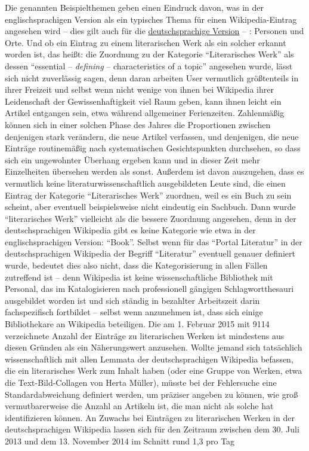 \documentclass[fontsize=12pt]{scrartcl}
\begin{document}
Die genannten Beispielthemen geben einen Eindruck davon, was in der eng\-lischspra\-chi\-gen Version als ein ty\-pisches Thema f\"ur einen Wi\-ki\-pe\-dia-Eintrag angesehen wird -- dies gilt auch f\"ur die \href{https://de.wikipedia.org/wiki/Wikipedia:Kategorien}{deutschspra\-chi\-ge Version} -- : Per\-so\-nen und Orte. Und ob ein Eintrag zu einem li\-te\-ra\-rischen Werk als ein solcher erkannt worden ist, das hei{\ss}t: die Zuordnung zu der Kategorie "`Li\-te\-ra\-risches Werk"' als dessen "`essential -- \textit{defining} -- characteristics of a topic"' angesehen wurde, l\"asst sich nicht zuverl\"assig sagen, denn daran arbei\-ten \mbox{User} vermutlich gr\"o{\ss}tenteils in ihrer Freizeit und \mbox{selbst} wenn nicht wenige von ihnen bei Wi\-ki\-pe\-dia ihrer Leidenschaft der Gewissenhaftigkeit viel Raum geben, kann ihnen leicht ein Artikel entgangen sein, etwa w\"ahrend allgemeiner Ferienzei\-ten. Zahlenm\"a{\ss}ig k\"onnen sich in einer solchen Phase des Jahres die Proportionen zwischen denjenigen stark ver\"andern, die neue Artikel verfassen, und denjenigen, die neue Eintr\"age routinem\"a{\ss}ig nach systematischen Gesichtspunkten durchsehen, so dass sich ein ungewohnter \"Uberhang ergeben kann und in dieser Zeit mehr Einzelhei\-ten \"ubersehen werden als sonst. Au{\ss}erdem ist davon auszugehen, dass es vermutlich keine li\-te\-ra\-tur\-wissenschaftlich ausgebildeten Leute sind, die einen Eintrag der Kategorie "`Li\-te\-ra\-risches Werk"' zuordnen, weil es ein Buch zu sein scheint, aber eventuell beispielsweise nicht eindeutig ein Sachbuch. Dann wurde "`li\-te\-ra\-risches Werk"' viel\-leicht als die bessere Zuordnung angesehen, denn in der deutschspra\-chi\-gen Wi\-ki\-pe\-dia gibt es keine Kategorie wie etwa in der eng\-lischspra\-chi\-gen Version: "`Book"'. \mbox{Selbst} wenn f\"ur das "`Portal Li\-te\-ra\-tur"' in der deutschspra\-chi\-gen Wi\-ki\-pe\-dia der Begriff "`Li\-te\-ra\-tur"' eventuell genauer definiert wurde, bedeutet dies also nicht, dass die Kategorisierung in allen F\"allen zutreffend ist -- denn Wi\-ki\-pe\-dia ist keine wissenschaftliche Bibliothek mit Personal, das im Katalogisieren nach professionell g\"angigen Schlagwortthesauri ausgebildet worden ist und sich st\"andig in bezahlter Arbeitszeit darin fachspezifisch fortbildet -- \mbox{selbst} wenn anzunehmen ist, dass sich einige Bibliothekare\textsuperscript{\tiny *} an Wi\-ki\-pe\-dia beteiligen. Die am 1. Februar 2015 mit 9114 verzeichnete Anzahl der Eintr\"age zu li\-te\-ra\-rischen Werken ist mindestens aus diesen Gr\"unden als ein N\"aherungswert anzusehen. Wollte jemand sich tats\"achlich wissenschaftlich mit allen Lemmata der deutschspra\-chi\-gen Wi\-ki\-pe\-dia befassen, die ein li\-te\-ra\-risches Werk zum Inhalt haben (oder eine Gruppe von Werken, etwa die Text-Bild-Collagen von Herta M\"uller), m\"usste bei der Fehlersuche eine Standardabweichung definiert werden, um pr\"aziser angeben zu k\"onnen, wie gro{\ss} vermutbarerweise die Anzahl an Artikeln ist, die man nicht als solche hat identifizieren k\"onnen. An Zuwachs bei Eintr\"agen zu li\-te\-ra\-rischen Werken in der deutschspra\-chi\-gen Wi\-ki\-pe\-dia lassen sich f\"ur den Zeitraum zwischen dem 30. Juli 2013 und dem 13. November 2014 im Schnitt rund 1,3 pro Tag 
\end{document}
